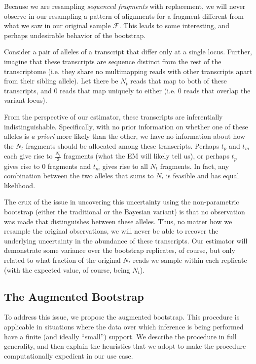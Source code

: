Because we are resampling \textit{sequenced fragments} with replacement, we will never observe in our 
resampling a pattern of alignments for a fragment different from what we saw in our original sample 
$\mathcal{F}$. This leads to some interesting, and perhaps undesirable behavior of the bootstrap. 

Consider a pair of alleles of a transcript that differ only at a single locus.  Further, imagine 
that these transcripts are sequence distinct from the rest of the transcriptome (i.e. they share no 
multimapping reads with other transcripts apart from their sibling allele).  Let there be $N_t$ 
reads that map to both of these transcripts, and $0$ reads that map uniquely to either (i.e. 0 
reads that overlap the variant locus).

From the perspective of our estimator, these transcripts are inferentially indistinguishable.  
Specifically, with no prior information on whether one of these alleles is \textit{a priori} more likely 
than the other, we have no information about how the $N_t$ fragments should be allocated among 
these transcripts.  Perhaps $t_p$ and $t_m$ each give rise to $\frac{N_t}{2}$ fragments (what the 
EM will likely tell us), or perhaps $t_p$ gives rise to 0 fragments and $t_m$ gives rise to all 
$N_t$ fragments.  In fact, any combination between the two alleles that sums to $N_t$ is feasible 
and has equal likelihood.

The crux of the issue in uncovering this uncertainty using the non-parametric bootstrap (either the 
traditional or the Bayesian variant) is that no observation was made that distinguishes between 
these alleles.  Thus, no matter how we resample the original observations, we will never be able 
to recover the underlying uncertainty in the abundance of these transcripts.  Our estimator will 
demonstrate some variance over the bootstrap replicates, of course, but only related to what 
fraction of the original $N_t$ reads we sample within each replicate (with the expected value, 
of course, being $N_t$).

\subsection{The Augmented Bootstrap}

To address this issue, we propose the augmented bootstrap.  This procedure is applicable in 
situations where the data over which inference is being performed have a finite (and ideally ``small'') 
support. %
We describe the procedure in 
full generality, and then explain the heuristics that we adopt to make the procedure computationally 
expedient in our use case.

